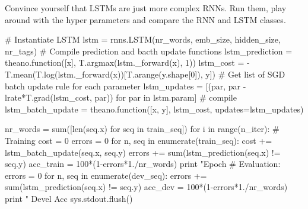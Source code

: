\begin{exercise}
Convince yourself that LSTMs are just more complex RNNs. Run them, play around
with the hyper parameters and compare the RNN and LSTM classes.
\begin{python}
# Instantiate LSTM
lstm = rnns.LSTM(nr_words, emb_size, hidden_size, nr_tags)
# Compile prediction and bacth update functions
lstm_prediction = theano.function([x], T.argmax(lstm._forward(x), 1))
lstm_cost = -T.mean(T.log(lstm._forward(x))[T.arange(y.shape[0]), y])
# Get list of SGD batch update rule for each parameter
lstm_updates = [(par, par - lrate*T.grad(lstm_cost, par)) for par in lstm.param]
# compile
lstm_batch_update = theano.function([x, y], lstm_cost, updates=lstm_updates)
\end{python}

\begin{python}
nr_words = sum([len(seq.x) for seq in train_seq])
for i in range(n_iter):
    # Training
    cost = 0
    errors = 0
    for n, seq in enumerate(train_seq):
        cost += lstm_batch_update(seq.x, seq.y)
        errors += sum(lstm_prediction(seq.x) != seq.y)
    acc_train = 100*(1-errors*1./nr_words) 
    print "Epoch %
    # Evaluation:
    errors = 0
    for n, seq in enumerate(dev_seq):
        errors += sum(lstm_prediction(seq.x) != seq.y)  
    acc_dev = 100*(1-errors*1./nr_words) 
    print " Devel Acc %
    sys.stdout.flush()
\end{python}
\end{exercise}
